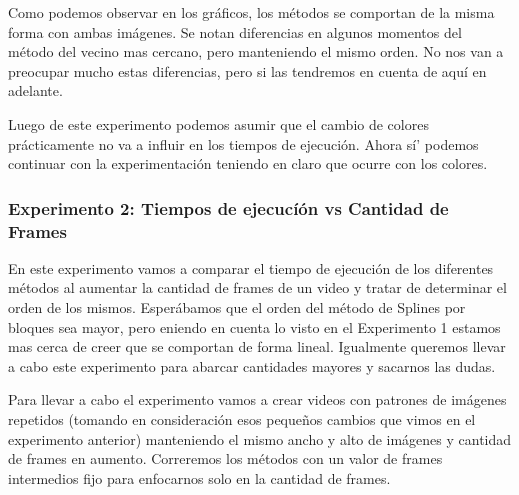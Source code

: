 \par Como podemos observar en los gr\'aficos, los m\'etodos se comportan de la misma forma con ambas im\'agenes. Se notan diferencias en algunos momentos del m\'etodo del vecino mas cercano, pero manteniendo el mismo orden. No nos van a preocupar mucho estas diferencias, pero si las tendremos en cuenta de aqu\'i en adelante.
\par Luego de este experimento podemos asumir que el cambio de colores pr\'acticamente no va a influir en los tiempos de ejecuci\'on. Ahora s\'i' podemos continuar con la experimentaci\'on teniendo en claro que ocurre con los colores.


\subsubsection{Experimento 2: Tiempos de ejecucí\'on vs Cantidad de Frames}
\par En este experimento vamos a comparar el tiempo de ejecuci\'on de los diferentes m\'etodos al aumentar la cantidad de frames de un video y tratar de determinar el orden de los mismos. Esper\'abamos que el orden del m\'etodo de Splines por bloques sea mayor, pero eniendo en cuenta lo visto en el Experimento 1 estamos mas cerca de creer que se comportan de forma lineal. Igualmente queremos llevar a cabo este experimento para abarcar cantidades mayores y sacarnos las dudas.

\par Para llevar a cabo el experimento vamos a crear videos con patrones de im\'agenes repetidos (tomando en consideraci\'on esos pequeños cambios que vimos en el experimento anterior) manteniendo el mismo ancho y alto de im\'agenes y cantidad de frames en aumento. Correremos los m\'etodos con un valor de frames intermedios fijo para enfocarnos solo en la cantidad de frames.


